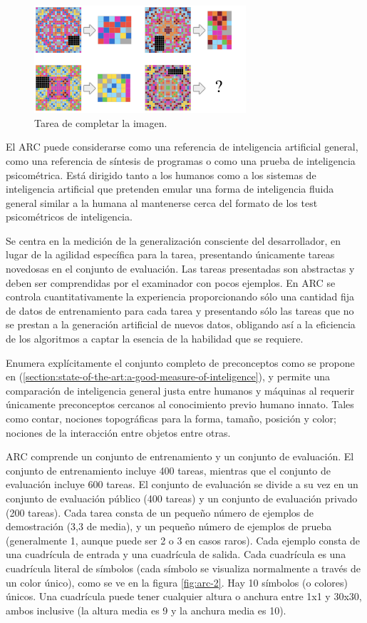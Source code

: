 \begin{figure}[ht!]
    \centering
    \includegraphics[width=0.7\textwidth]{Graphics/arc-3.png}
    \caption{Tarea de completar la imagen.}
    \label{fig:arc-3}
\end{figure}

El ARC puede considerarse como una referencia de inteligencia artificial general, como una referencia de síntesis de programas o como una prueba de inteligencia psicométrica. Está dirigido tanto a los humanos como a los sistemas de inteligencia artificial que pretenden emular una forma de inteligencia fluida general similar a la humana al mantenerse cerca del formato de los test psicométricos de inteligencia. 

Se centra en la medición de la generalización consciente del desarrollador, en lugar de la agilidad específica para la tarea, presentando únicamente tareas novedosas en el conjunto de evaluación. Las tareas presentadas son abstractas y deben ser comprendidas por el examinador con pocos ejemplos. En ARC se controla cuantitativamente la experiencia proporcionando sólo una cantidad fija de datos de entrenamiento para cada tarea y presentando sólo las tareas que no se prestan a la generación artificial de nuevos datos, obligando así a la eficiencia de los algoritmos a captar la esencia de la habilidad que se requiere.

Enumera explícitamente el conjunto completo de preconceptos como se propone en (\ref{section:state-of-the-art:a-good-measure-of-inteligence}), y permite una comparación de inteligencia general justa entre humanos y máquinas al requerir únicamente preconceptos cercanos al conocimiento previo humano innato. Tales como contar, nociones topográficas para la forma, tamaño, posición y color; nociones de la interacción entre objetos entre otras.

ARC comprende un conjunto de entrenamiento y un conjunto de evaluación. El conjunto de entrenamiento incluye 400 tareas, mientras que el conjunto de evaluación incluye 600 tareas. El conjunto de evaluación se divide a su vez en un conjunto de evaluación público (400 tareas) y un conjunto de evaluación privado (200 tareas). Cada tarea consta de un pequeño número de ejemplos de demostración (3,3 de media), y un pequeño número de ejemplos de prueba (generalmente 1, aunque puede ser 2 o 3 en casos raros). Cada ejemplo consta de una cuadrícula de entrada y una cuadrícula de salida. Cada cuadrícula es una cuadrícula literal de símbolos (cada símbolo se visualiza normalmente a través de un color único), como se ve en la figura \ref{fig:arc-2}. Hay 10 símbolos (o colores) únicos. Una cuadrícula puede tener cualquier altura o anchura entre 1x1 y 30x30, ambos inclusive (la altura media es 9 y la anchura media es 10).

